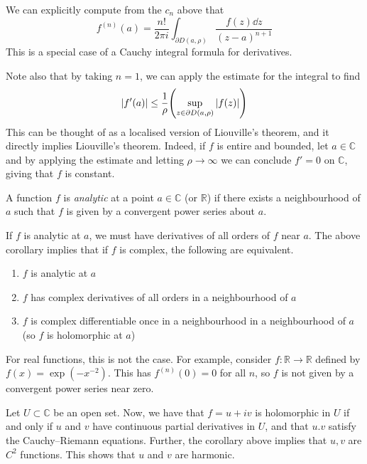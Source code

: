 \begin{remark}
	We can explicitly compute from the \( c_n \) above that
	\[
		f^{(n)}(a) = \frac{n!}{2\pi i}\int_{\partial D(a,\rho)} \frac{f(z) \dd{z}}{(z-a)^{n+1}}
	\]
	This is a special case of a Cauchy integral formula for derivatives.

	Note also that by taking \( n = 1 \), we can apply the estimate for the integral to find
	\[
		\abs{f'(a)} \leq \frac{1}{\rho}\qty(\sup_{z \in \partial D(a,\rho)} \abs{f(z)})
	\]
	This can be thought of as a localised version of Liouville's theorem, and it directly implies Liouville's theorem.
	Indeed, if \( f \) is entire and bounded, let \( a \in \mathbb C \) and by applying the estimate and letting \( \rho \to \infty \) we can conclude \( f' = 0 \) on \( \mathbb C \), giving that \( f \) is constant.
\end{remark}
\begin{definition}
	A function \( f \) is \textit{analytic} at a point \( a \in \mathbb C \) (or \( \mathbb R \)) if there exists a neighbourhood of \( a \) such that \( f \) is given by a convergent power series about \( a \).
\end{definition}
\begin{remark}
	If \( f \) is analytic at \( a \), we must have derivatives of all orders of \( f \) near \( a \).
	The above corollary implies that if \( f \) is complex, the following are equivalent.
	\begin{enumerate}
		\item \( f \) is analytic at \( a \)
		\item \( f \) has complex derivatives of all orders in a neighbourhood of \( a \)
		\item \( f \) is complex differentiable once in a neighbourhood in a neighbourhood of \( a \) (so \( f \) is holomorphic at \( a \))
	\end{enumerate}
	For real functions, this is not the case.
	For example, consider \( f \colon \mathbb R \to \mathbb R \) defined by \( f(x) = \exp(-x^{-2}) \).
	This has \( f^{(n)}(0) = 0 \) for all \( n \), so \( f \) is not given by a convergent power series near zero.

	Let \( U \subset \mathbb C \) be an open set.
	Now, we have that \( f = u+iv \) is holomorphic in \( U \) if and only if \( u \) and \( v \) have continuous partial derivatives in \( U \), and that \( u.v \) satisfy the Cauchy--Riemann equations.
	Further, the corollary above implies that \( u, v \) are \( C^2 \) functions.
	This shows that \( u \) and \( v \) are harmonic.
\end{remark}
